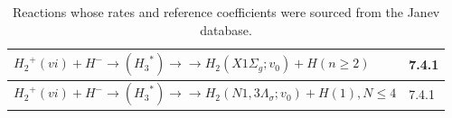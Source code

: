 \begin{table}[h]
\begin{tabular}{ | p{7cm}| m{3.5cm} | }
${H_2}^+(vi) + H^- \rightarrow ({H_3}^*) \rightarrow $\newline $\rightarrow H_2(X1\Sigma_g;v_0) + H(n\geq 2)$ & 7.4.1 \\    %
\hline
${H_2}^+(vi) + H^- \rightarrow ({H_3}^*) \rightarrow $\newline $\rightarrow H_2(N1,3\Lambda_{\sigma};v_0) + H(1),N \leq 4$ & 7.4.1 \\   %
\hline
\end{tabular}
\caption{Reactions whose rates and reference coefficients were sourced from the Janev database.\cite{Janev2003}}
\label{tab:janev}
\end{table}



